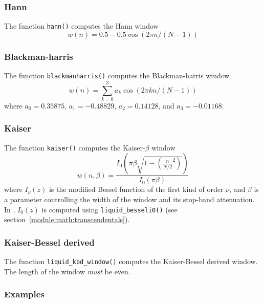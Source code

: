 \subsubsection{Hann}
\label{module:math:window:hann}
The function {\tt hann()} computes the Hann window
%
\begin{equation}
\label{eqn:math:window:hann}
    w(n) = 0.5 - 0.5 \cos\left( 2 \pi n / (N-1) \right)
\end{equation}
%

\subsubsection{Blackman-harris}
\label{module:math:window:blackmanharris}
The function {\tt blackmanharris()}
    computes the Blackman-harris window
%
\begin{equation}
\label{eqn:math:window:blackmanharris}
    w(n) = \sum_{k=0}^{3} { a_k \cos\left( 2 \pi k n / (N-1)\right) }
\end{equation}
%
where
$a_0 =  0.35875$,
$a_1 = -0.48829$,
$a_2 =  0.14128$, and
$a_3 = -0.01168$.

\subsubsection{Kaiser}
\label{module:math:window:kaiser}
The function {\tt kaiser()} computes the Kaiser-$\beta$ window
%
\begin{equation}
\label{eqn:math:window:kaiser}
    w(n,\beta) = \frac{
        I_0\left(\pi\beta\sqrt{1-\left(\frac{n}{N/2}^2\right)}\right)
    }{
        I_0\left(\pi\beta\right)
    }
\end{equation}
%
where $I_\nu(z)$ is the modified Bessel function of the first kind of
order $\nu$, and $\beta$ is a parameter controlling the width of the
window and its stop-band attenuation.
In \liquid, $I_0(z)$ is computed using {\tt liquid\_besseli0()} (see
section~\ref{module:math:transcendentals}).

\subsubsection{Kaiser-Bessel derived}
\label{module:math:window:kbd}
The function {\tt liquid\_kbd\_window()}
computes the Kaiser-Bessel derived window.
The length of the window {\em must} be even.

\subsubsection{Examples}
\label{module:math:window:examples}

